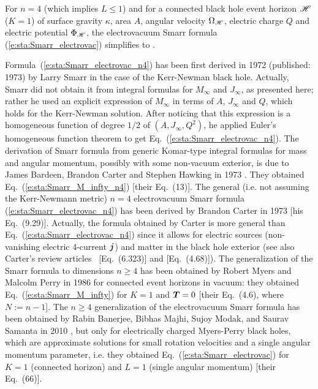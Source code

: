 \begin{prop}
For $n=4$ (which implies $L\leq 1$) and for a connected black hole event horizon
$\mathscr{H}$ ($K=1$) of surface gravity $\kappa$, area $A$, angular velocity
$\Omega_{\mathscr{H}}$, electric charge $Q$ and electric potential $\Phi_{\mathscr{H}}$,
the electrovacuum Smarr formula
(\ref{e:sta:Smarr_electrovac}) simplifies to
\be \label{e:sta:Smarr_electrovac_n4}
    .
\ee
\end{prop}

\begin{hist}
Formula~(\ref{e:sta:Smarr_electrovac_n4}) has been first derived in 1972 (published: 1973)
by Larry Smarr
\cite{Smarr73} in the case of the Kerr-Newman black hole.
Actually, Smarr did not obtain it from integral formulas for $M_\infty$ and $J_\infty$,
as presented here; rather he used an explicit expression of $M_\infty$ in terms
of $A$, $J_\infty$ and $Q$, which holds for the Kerr-Newman solution.
After noticing that this expression is a homogeneous function of degree $1/2$
of $(A,J_\infty,Q^2)$, he applied Euler's homogeneous function theorem to get
Eq.~(\ref{e:sta:Smarr_electrovac_n4}). The derivation of Smarr formula
from generic Komar-type integral formulas for mass and angular momentum,
possibly with some non-vacuum exterior,
is due to James Bardeen, Brandon Carter
and Stephen Hawking in 1973 \cite{BardeCH73}. They obtained
Eq.~(\ref{e:sta:Smarr_M_infty_n4}) [their Eq.~(13)].
The general (i.e. not assuming the Kerr-Newmann metric)
$n=4$ electrovacuum Smarr formula (\ref{e:sta:Smarr_electrovac_n4}) has
been derived by Brandon Carter in 1973 \cite{Carte73b} [his Eq.~(9.29)].
Actually, the formula obtained by Carter is more general than Eq.~(\ref{e:sta:Smarr_electrovac_n4})
since it allows for electric sources (non-vanishing electric 4-current $\bm{j}$) and matter in the black hole exterior (see also Carter's review articles~\cite{Carte79c} [Eq.~(6.323)]
and \cite{Carte87} [Eq.~(4.68)]).
The generalization of the Smarr formula to dimensions $n \geq 4$ has been
obtained by Robert Myers and Malcolm Perry
in 1986 \cite{MyersP86}
for connected event horizons in vacuum: they obtained Eq.~(\ref{e:sta:Smarr_M_infty})
for $K=1$ and $\bm{T}=0$ [their Eq.~(4.6), where $N := n - 1$].
The $n \geq 4$ generalization of the electrovacuum Smarr formula has been obtained
by Rabin Banerjee, Bibhas Majhi, Sujoy Modak, and Saurav Samanta
in 2010 \cite{BanerMMS10}, but only for electrically charged Myers-Perry black holes,
which are approximate solutions for small rotation velocities and a single angular momentum
parameter,
i.e. they obtained Eq.~(\ref{e:sta:Smarr_electrovac}) for $K=1$ (connected horizon)
and $L=1$ (single angular momentum) [their Eq.~(66)].
\end{hist}


